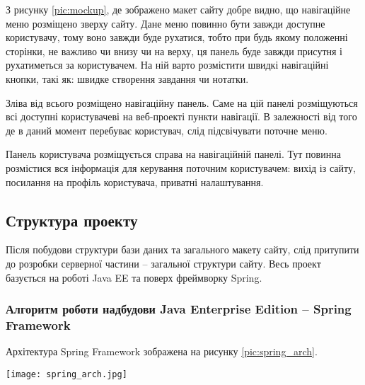 \par З рисунку \ref{pic:mockup}, де зображено макет сайту добре видно, що навігаційне меню розміщено зверху сайту. Дане меню повинно бути завжди доступне користувачу, тому воно завжди буде рухатися, тобто при будь якому положенні сторінки, не важливо чи внизу чи на верху, ця панель буде завжди присутня і рухатиметься за користувачем. На ній варто розмістити швидкі навігаційні кнопки, такі як: швидке створення завдання чи нотатки.
\par Зліва від всього розміщено навігаційну панель. Саме на цій панелі розміщуються всі доступні  користувачеві на веб-проекті пункти навігації. В залежності від того де в даний момент перебуває користувач, слід підсвічувати поточне меню.
\par Панель користувача розміщується справа на навігаційній панелі. Тут повинна розмістися вся інформація для керування поточним користувачем: вихід із сайту, посилання на профіль користувача, приватні налаштування.

\subsection{Структура проекту}
\par Після побудови структури бази даних та загального макету сайту, слід притупити до розробки серверної частини -- загальної структури сайту. Весь проект базується на роботі Java EE та поверх фреймворку Spring.

\subsubsection{Алгоритм роботи надбудови Java Enterprise Edition -- Spring Framework}
Архітектура Spring Framework зображена на рисунку \ref{pic:spring_arch}.

	\begin{center}
			\texttt{[image: spring\_arch.jpg]}
			\vspace{18pt}
			\label{pic:spring_arch}
	\end{center}

